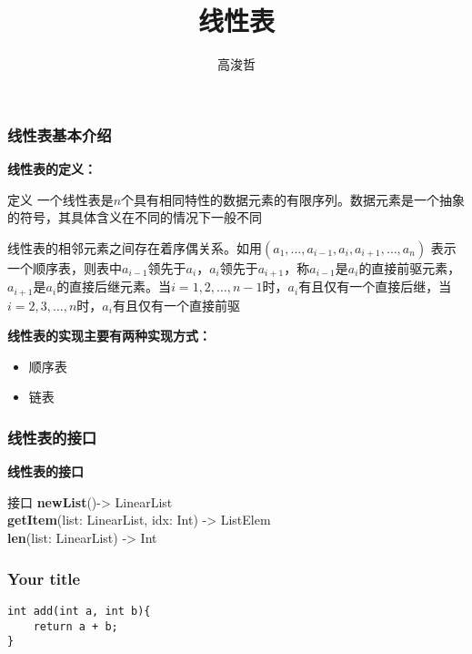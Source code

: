 \documentclass{beamer}
\author{高浚哲}
\institute{西安邮电大学}
\title{线性表}
\begin{document}
	
	\frame{\titlepage}
	
	\begin{frame}[c]\frametitle{线性表基本介绍}
		\textbf{线性表的定义：}
		\begin{block}{定义}
			一个线性表是$n$个具有相同特性的数据元素的有限序列。数据元素是一个抽象的符号，其具体含义在不同的情况下一般不同 \par
			线性表的相邻元素之间存在着序偶关系。如用$(a_1,\dots, a_{i - 1}, a_i, a_{i + 1},\dots,a_n)$ 表示一个顺序表，则表中$a_{i - 1}$领先于$a_i$，$a_i$领先于$a_{i+1}$，称$a_{i-1}$是$a_i$的直接前驱元素，$a_{i+1}$是$a_i$的直接后继元素。当$i=1,2,\dots,n-1$时，$a_i$有且仅有一个直接后继，当$i=2,3,\dots,n$时，$a_i$有且仅有一个直接前驱
		\end{block}
		\textbf{线性表的实现主要有两种实现方式：}
		\begin{itemize}
			\item 顺序表
			\item 链表
		\end{itemize}
	\end{frame}
	
	\begin{frame}[fragile]\frametitle{线性表的接口}
		\textbf{线性表的接口}
		\begin{block}{接口}
			\textbf{newList}()-> LinearList\\
			\textbf{getItem}(list: LinearList, idx: Int) -> ListElem \\
			\textbf{len}(list: LinearList) -> Int
		\end{block}
	\end{frame}

	\begin{frame}[fragile]\frametitle{Your title}
\begin{verbatim}
int add(int a, int b){
    return a + b;
}
\end{verbatim}
	\end{frame}
\end{document}
